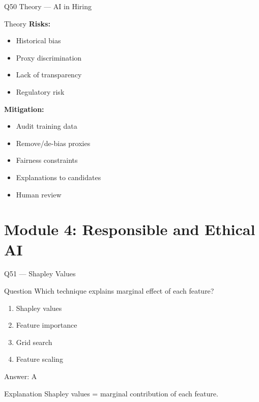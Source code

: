 \documentclass[aspectratio=169,8pt]{beamer}
\begin{document}
	\begin{frame}{Q50 Theory --- AI in Hiring}
		\begin{block}{Theory}
			\textbf{Risks:}
			\begin{itemize}
				\item Historical bias
				\item Proxy discrimination
				\item Lack of transparency
				\item Regulatory risk
			\end{itemize}
			\textbf{Mitigation:}
			\begin{itemize}
				\item Audit training data
				\item Remove/de-bias proxies
				\item Fairness constraints
				\item Explanations to candidates
				\item Human review
			\end{itemize}
		\end{block}
	\end{frame}
	
	\section{Module 4: Responsible and Ethical AI}
	
	\begin{frame}{Q51 --- Shapley Values}
		\begin{block}{Question}
			Which technique explains marginal effect of each feature?
		\end{block}
		\begin{enumerate}[label=\Alph*.]
			\item Shapley values
			\item Feature importance
			\item Grid search
			\item Feature scaling
		\end{enumerate}
		\begin{exampleblock}{Answer: A}
		\end{exampleblock}
		\begin{block}{Explanation}
			Shapley values = marginal contribution of each feature.
		\end{block}
	\end{frame}
	
\end{document}
